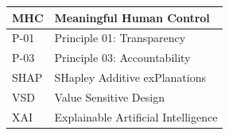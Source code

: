 \begin{table}[H]
\begin{tabular}{|l|l|}
		MHC      & Meaningful Human Control \citep{mhcof}                                                                           \\ \hline
		P-01     & Principle 01: Transparency \citep{khan2021ethicsaisystematicliterature}                                          \\ \hline
		P-03     & Principle 03: Accountability \citep{khan2021ethicsaisystematicliterature}                                        \\ \hline
		SHAP     & SHapley Additive exPlanations \citep{lundberg2017unifiedapproachinterpretingmodel}                                \\ \hline
		VSD      & Value Sensitive Design \citep{friedman2008vsd, friedman2013vsd}                                                                   \\ \hline
		XAI      & Explainable Artificial Intelligence                                                                              \\ \hline
	\end{tabular}
\end{table}


